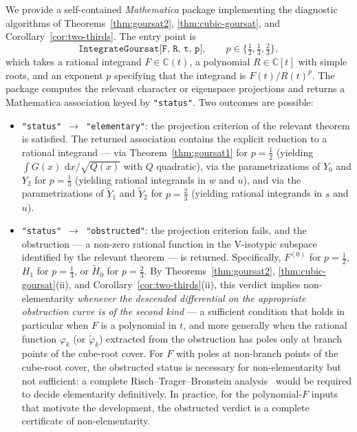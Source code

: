 \documentclass[11pt,a4paper]{article}
\theoremstyle{plain}
\theoremstyle{definition}
\theoremstyle{remark}
\newcommand{\C}{\mathbb{C}}
\renewcommand{\d}{\,\mathrm{d}}
\begin{document}
We provide a self-contained \emph{Mathematica} package implementing the diagnostic algorithms of Theorems~\ref{thm:goursat2}, \ref{thm:cubic-goursat}, and Corollary~\ref{cor:two-thirds}. The entry point is
\[
  \texttt{IntegrateGoursat[F, R, t, p]},\qquad p\in\{\tfrac{1}{2},\tfrac{1}{3},\tfrac{2}{3}\},
\]
which takes a rational integrand $F\in\C(t)$, a polynomial $R\in\C[t]$ with simple roots, and an exponent $p$ specifying that the integrand is $F(t)/R(t)^p$. The package computes the relevant character or eigenspace projections and returns a Mathematica association keyed by \texttt{"status"}. Two outcomes are possible:
\begin{itemize}
  \item \texttt{"status"\,$\to$\,"elementary"}: the projection criterion of the relevant theorem is satisfied. The returned association contains the explicit reduction to a rational integrand --- via Theorem~\ref{thm:goursat1} for $p=\tfrac{1}{2}$ (yielding $\int G(x)\,\d x/\sqrt{Q(x)}$ with $Q$ quadratic), via the parametrizations of $Y_0$ and $Y_2$ for $p=\tfrac{1}{3}$ (yielding rational integrands in $w$ and $u$), and via the parametrizations of $\widetilde Y_1$ and $\widetilde Y_2$ for $p=\tfrac{2}{3}$ (yielding rational integrands in $s$ and $u$).
  \item \texttt{"status"\,$\to$\,"obstructed"}: the projection criterion fails, and the obstruction --- a non-zero rational function in the V-isotypic subspace identified by the relevant theorem --- is returned. Specifically, $F^{(0)}$ for $p=\tfrac{1}{2}$, $H_1$ for $p=\tfrac{1}{3}$, or $\widetilde H_0$ for $p=\tfrac{2}{3}$. By Theorems~\ref{thm:goursat2}, \ref{thm:cubic-goursat}(ii), and Corollary~\ref{cor:two-thirds}(ii), this verdict implies non-elementarity \emph{whenever the descended differential on the appropriate obstruction curve is of the second kind} --- a sufficient condition that holds in particular when $F$ is a polynomial in $t$, and more generally when the rational function $\varphi_k$ (or $\widetilde\varphi_k$) extracted from the obstruction has poles only at branch points of the cube-root cover. For $F$ with poles at non-branch points of the cube-root cover, the obstructed status is necessary for non-elementarity but not sufficient: a complete Risch--Trager--Bronstein analysis~\cite{Trager1984,Bronstein2005} would be required to decide elementarity definitively. In practice, for the polynomial-$F$ inputs that motivate the development, the obstructed verdict is a complete certificate of non-elementarity.
\end{itemize}
\end{document}
